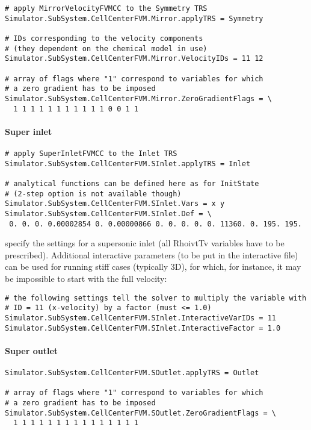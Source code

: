 \documentclass[11pt]{article}
\begin{document}
\begin{verbatim}
# apply MirrorVelocityFVMCC to the Symmetry TRS 
Simulator.SubSystem.CellCenterFVM.Mirror.applyTRS = Symmetry

# IDs corresponding to the velocity components 
# (they dependent on the chemical model in use)
Simulator.SubSystem.CellCenterFVM.Mirror.VelocityIDs = 11 12

# array of flags where "1" correspond to variables for which 
# a zero gradient has to be imposed
Simulator.SubSystem.CellCenterFVM.Mirror.ZeroGradientFlags = \
  1 1 1 1 1 1 1 1 1 1 1 0 0 1 1
\end{verbatim}

\paragraph{Super inlet}

\begin{verbatim}
# apply SuperInletFVMCC to the Inlet TRS
Simulator.SubSystem.CellCenterFVM.SInlet.applyTRS = Inlet

# analytical functions can be defined here as for InitState 
# (2-step option is not available though)
Simulator.SubSystem.CellCenterFVM.SInlet.Vars = x y
Simulator.SubSystem.CellCenterFVM.SInlet.Def = \
 0. 0. 0. 0.00002854 0. 0.00000866 0. 0. 0. 0. 0. 11360. 0. 195. 195.
\end{verbatim}
specify the settings for a supersonic inlet (all RhoivtTv variables have to be prescribed).
Additional interactive parameters (to be put in the interactive file) can be used 
for running stiff cases (typically 3D), for which, for instance, it may be impossible 
to start with the full velocity:

\begin{verbatim}
# the following settings tell the solver to multiply the variable with 
# ID = 11 (x-velocity) by a factor (must <= 1.0)
Simulator.SubSystem.CellCenterFVM.SInlet.InteractiveVarIDs = 11
Simulator.SubSystem.CellCenterFVM.SInlet.InteractiveFactor = 1.0
\end{verbatim}

\paragraph{Super outlet}

\begin{verbatim}
Simulator.SubSystem.CellCenterFVM.SOutlet.applyTRS = Outlet

# array of flags where "1" correspond to variables for which 
# a zero gradient has to be imposed
Simulator.SubSystem.CellCenterFVM.SOutlet.ZeroGradientFlags = \
  1 1 1 1 1 1 1 1 1 1 1 1 1 1 1
\end{verbatim}
\end{document}
